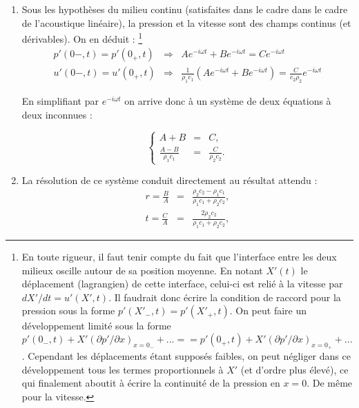 \documentclass[10pt, a4paper]{article}
\newcommand{\question}[1]{}
\newcommand{\answer}[1]{#1}
\begin{document}
\begin{enumerate}
\item 
\question{
Justifiez que la pression $p'$ et la vitesse $u'$ sont continues à l'interface entre les deux milieux 
(en $x=0$). En déduire un système de 2 équations pour les 2 inconnues $B$ et $C$ ($A$ étant supposé connu).
}
\answer{Sous les hypothèses du milieu continu (satisfaites dans le cadre dans le cadre de l'acoustique linéaire), la pression et la vitesse sont des champs continus (et dérivables).
On en déduit :
\footnote{En toute rigueur, il faut tenir compte du fait que l'interface entre les deux milieux oscille autour de sa position moyenne. En notant $X'(t)$ le déplacement (lagrangien) de cette interface, celui-ci est relié à la vitesse par $d X'/dt = u'(X',t)$. Il faudrait donc écrire la condition de raccord pour la pression sous la forme $p'(X'_-,t) = p'(X'_+,t)$.  On peut faire un développement limité sous la forme $p'(0_-,t) + X' \left(\partial p'/\partial x\right)_{x=0_-} + ... =
 =p'(0_+,t) + X' \left(\partial p'/\partial x\right)_{x=0_+} + ... $. Cependant les déplacements étant supposés faibles, on peut négliger dans ce développement tous les termes proportionnels à $X'$ (et d'ordre plus élevé), ce qui finalement aboutit à écrire la continuité de la pression en $x=0$. De même pour la vitesse.} 
\begin{eqnarray}
p'(0-,t) = p'(0_+,t) 
& \Longrightarrow & A e^{-i  \omega t} + B e^{-i  \omega t} = C e^{-i  \omega t} 
\\
u'(0-,t) = u'(0_+,t) 
&\Longrightarrow & 
\frac{1}{\rho_1 c_1} \left( A e^{-i  \omega t} + B e^{-i  \omega t} \right) 
= \frac{C}{c_2 \rho_2} e^{-i  \omega t} 
\end{eqnarray}

En simplifiant par $e^{-i\omega t}$ on arrive donc à un système de deux équations à deux inconnues :

\begin{equation}
 \left\{ 
 \begin{array}{lcr}  A+B &=& C,\\
 \displaystyle \frac{A-B}{\rho_1 c_1} &=& \displaystyle  \frac{C}{\rho_2 c_2}.
 \end{array}
\right. 
\label{eq:ABCeqs}
\end{equation}

}




\item 
\question{En déduire la valeur des coefficients de réflexion et de de transmission en amplitude-pression :}
\answer{La résolution de ce système conduit directement au résultat attendu :}
\begin{eqnarray}
r = \frac{B}{A} &=& \frac{\rho_2 c_2 - \rho_1 c_1}{\rho_1 c_1 + \rho_2 c_2},\\
t = \frac{C}{A} &=& \frac{2 \rho_2 c_2}{\rho_1 c_1 + \rho_2 c_2},
\label{eq:rt}
\end{eqnarray}



\end{enumerate}
\end{document}
